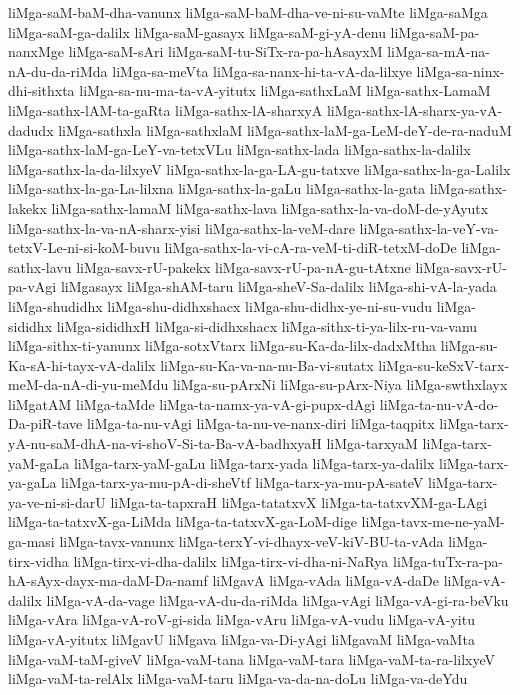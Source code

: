 {liMga-saM-baM-dha-vanunx
liMga-saM-baM-dha-ve-ni-su-vaMte
liMga-saMga
liMga-saM-ga-dalilx
liMga-saM-gasayx
liMga-saM-gi-yA-denu
liMga-saM-pa-nanxMge
liMga-saM-sAri
liMga-saM-tu-SiTx-ra-pa-hAsayxM
liMga-sa-mA-na-nA-du-da-riMda
liMga-sa-meVta
liMga-sa-nanx-hi-ta-vA-da-lilxye
liMga-sa-ninx-dhi-sithxta
liMga-sa-nu-ma-ta-vA-yitutx
liMga-sathxLaM
liMga-sathx-LamaM
liMga-sathx-lAM-ta-gaRta
liMga-sathx-lA-sharxyA
liMga-sathx-lA-sharx-ya-vA-dadudx
liMga-sathxla
liMga-sathxlaM
liMga-sathx-laM-ga-LeM-deY-de-ra-naduM
liMga-sathx-laM-ga-LeY-va-tetxVLu
liMga-sathx-lada
liMga-sathx-la-dalilx
liMga-sathx-la-da-lilxyeV
liMga-sathx-la-ga-LA-gu-tatxve
liMga-sathx-la-ga-Lalilx
liMga-sathx-la-ga-La-lilxna
liMga-sathx-la-gaLu
liMga-sathx-la-gata
liMga-sathx-lakekx
liMga-sathx-lamaM
liMga-sathx-lava
liMga-sathx-la-va-doM-de-yAyutx
liMga-sathx-la-va-nA-sharx-yisi
liMga-sathx-la-veM-dare
liMga-sathx-la-veY-va-tetxV-Le-ni-si-koM-buvu
liMga-sathx-la-vi-cA-ra-veM-ti-diR-tetxM-doDe
liMga-sathx-lavu
liMga-savx-rU-pakekx
liMga-savx-rU-pa-nA-gu-tAtxne
liMga-savx-rU-pa-vAgi
liMgasayx
liMga-shAM-taru
liMga-sheV-Sa-dalilx
liMga-shi-vA-la-yada
liMga-shudidhx
liMga-shu-didhxshacx
liMga-shu-didhx-ye-ni-su-vudu
liMga-sididhx
liMga-sididhxH
liMga-si-didhxshacx
liMga-sithx-ti-ya-lilx-ru-va-vanu
liMga-sithx-ti-yanunx
liMga-sotxVtarx
liMga-su-Ka-da-lilx-dadxMtha
liMga-su-Ka-sA-hi-tayx-vA-dalilx
liMga-su-Ka-va-na-nu-Ba-vi-sutatx
liMga-su-keSxV-tarx-meM-da-nA-di-yu-meMdu
liMga-su-pArxNi
liMga-su-pArx-Niya
liMga-swthxlayx
liMgatAM
liMga-taMde
liMga-ta-namx-ya-vA-gi-pupx-dAgi
liMga-ta-nu-vA-do-Da-piR-tave
liMga-ta-nu-vAgi
liMga-ta-nu-ve-nanx-diri
liMga-taqpitx
liMga-tarx-yA-nu-saM-dhA-na-vi-shoV-Si-ta-Ba-vA-badhxyaH
liMga-tarxyaM
liMga-tarx-yaM-gaLa
liMga-tarx-yaM-gaLu
liMga-tarx-yada
liMga-tarx-ya-dalilx
liMga-tarx-ya-gaLa
liMga-tarx-ya-mu-pA-di-sheVtf
liMga-tarx-ya-mu-pA-sateV
liMga-tarx-ya-ve-ni-si-darU
liMga-ta-tapxraH
liMga-tatatxvX
liMga-ta-tatxvXM-ga-LAgi
liMga-ta-tatxvX-ga-LiMda
liMga-ta-tatxvX-ga-LoM-dige
liMga-tavx-me-ne-yaM-ga-masi
liMga-tavx-vanunx
liMga-terxY-vi-dhayx-veV-kiV-BU-ta-vAda
liMga-tirx-vidha
liMga-tirx-vi-dha-dalilx
liMga-tirx-vi-dha-ni-NaRya
liMga-tuTx-ra-pa-hA-sAyx-dayx-ma-daM-Da-namf
liMgavA
liMga-vAda
liMga-vA-daDe
liMga-vA-dalilx
liMga-vA-da-vage
liMga-vA-du-da-riMda
liMga-vAgi
liMga-vA-gi-ra-beVku
liMga-vAra
liMga-vA-roV-gi-sida
liMga-vAru
liMga-vA-vudu
liMga-vA-yitu
liMga-vA-yitutx
liMgavU
liMgava
liMga-va-Di-yAgi
liMgavaM
liMga-vaMta
liMga-vaM-taM-giveV
liMga-vaM-tana
liMga-vaM-tara
liMga-vaM-ta-ra-lilxyeV
liMga-vaM-ta-relAlx
liMga-vaM-taru
liMga-va-da-na-doLu
liMga-va-deYdu
}
